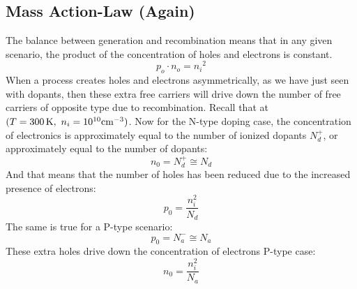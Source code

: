 \subsection{Mass Action-Law (Again)}
The balance between generation and recombination means that in any given scenario, the product of the concentration of holes and electrons is constant.  
\begin{equation}
        {p_o} \cdot {n_o} = {n_i}^2
\end{equation} 
When a process creates holes and electrons asymmetrically, as we have just seen with dopants, then these extra free carriers will drive down the number of free carriers of opposite type due to recombination.   Recall that at $(T = 300\,{\rm{K}},\,\,{n_i} = {10^{10}}{\rm{c}}{{\rm{m}}^{ - 3}})$.  Now for the N-type doping case, the concentration of electronics is approximately equal to the number of ionized dopants $N_d^+$, or approximately equal to the number of dopants:
\begin{equation}
{n_0} = N_d^+  \cong {N_d}
\end{equation}
And that means that the number of holes has been reduced due to the increased presence of electrons:
\begin{equation}
        p_0 = \frac{n_i^2}{N_d}
\end{equation}
The same is true for a P-type scenario:
\begin{equation}
{p_0} = N_a^ -  \cong {N_a} 
\end{equation}
These extra holes drive down the concentration of electrons 
{ P-type case:} \begin{equation}
        n_0 = \frac{n_i^2}{N_a}
\end{equation}
